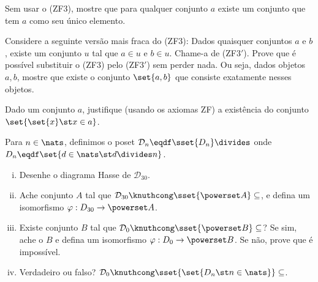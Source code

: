 \begin{exercise}
	Sem usar o (ZF3), mostre que para qualquer conjunto $a$ existe um conjunto que tem $a$ como seu único elemento.
\end{exercise}

\begin{exercise}
	Considere a seguinte versão mais fraca do (ZF3):
	\newline
	\newline Dados quaisquer conjuntos $a$ e $b$, existe um conjunto $u$ tal que $a \in u$ e $b \in u$.
	\newline
	\newline Chame-a de (ZF3$'$). Prove que é possível substituir o (ZF3) pelo (ZF3$'$) sem perder nada. Ou seja, dados objetos $a, b$, mostre que existe o conjunto $\set {a, b}$ que consiste exatamente nesses objetos.
\end{exercise}

\begin{exercise}
	Dado um conjunto $a$, justifique (usando os axiomas ZF) a existência do conjunto $\set {\set {x} \st x \in a}$.
\end{exercise}

\begin{exercise}
	Para $n \in \nats$, definimos o poset $\mathcal{D}_n \eqdf \sset {D_n} \divides$ onde $D_n \eqdf \set {d \in \nats \st d \divides n}$.
	\begin{enumerate}[(i)]
		\item Desenhe o diagrama Hasse de $\mathcal{D}_{30}$.
		\item Ache conjunto $A$ tal que $\mathcal{D}_{30} \knuthcong \sset {\powerset A} \subseteq$, e defina um isomorfismo $\varphi : D_{30} \to \powerset A$.
		\item Existe conjunto $B$ tal que $\mathcal{D}_0 \knuthcong \sset {\powerset B} \subseteq$? Se sim, ache o $B$ e defina um isomorfismo $\varphi : D_0 \to \powerset B$. Se não, prove que é impossível.
		\item Verdadeiro ou falso? $\mathcal{D}_0 \knuthcong \sset {\set {D_n \st n \in \nats}} \subseteq$.
	\end{enumerate}
\end{exercise}
